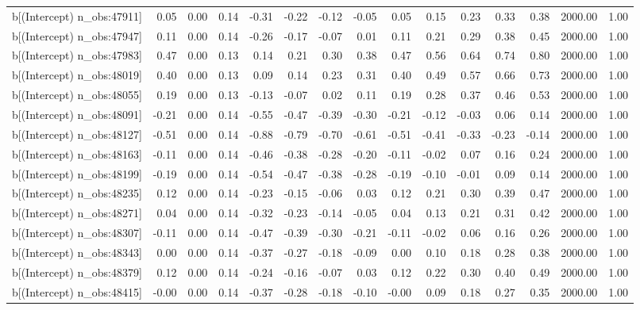 \begin{table}[ht]
\begin{tabular}{rrrrrrrrrrrrrrr}
  b[(Intercept) n\_obs:47911] & 0.05 & 0.00 & 0.14 & -0.31 & -0.22 & -0.12 & -0.05 & 0.05 & 0.15 & 0.23 & 0.33 & 0.38 & 2000.00 & 1.00 \\ 
  b[(Intercept) n\_obs:47947] & 0.11 & 0.00 & 0.14 & -0.26 & -0.17 & -0.07 & 0.01 & 0.11 & 0.21 & 0.29 & 0.38 & 0.45 & 2000.00 & 1.00 \\ 
  b[(Intercept) n\_obs:47983] & 0.47 & 0.00 & 0.13 & 0.14 & 0.21 & 0.30 & 0.38 & 0.47 & 0.56 & 0.64 & 0.74 & 0.80 & 2000.00 & 1.00 \\ 
  b[(Intercept) n\_obs:48019] & 0.40 & 0.00 & 0.13 & 0.09 & 0.14 & 0.23 & 0.31 & 0.40 & 0.49 & 0.57 & 0.66 & 0.73 & 2000.00 & 1.00 \\ 
  b[(Intercept) n\_obs:48055] & 0.19 & 0.00 & 0.13 & -0.13 & -0.07 & 0.02 & 0.11 & 0.19 & 0.28 & 0.37 & 0.46 & 0.53 & 2000.00 & 1.00 \\ 
  b[(Intercept) n\_obs:48091] & -0.21 & 0.00 & 0.14 & -0.55 & -0.47 & -0.39 & -0.30 & -0.21 & -0.12 & -0.03 & 0.06 & 0.14 & 2000.00 & 1.00 \\ 
  b[(Intercept) n\_obs:48127] & -0.51 & 0.00 & 0.14 & -0.88 & -0.79 & -0.70 & -0.61 & -0.51 & -0.41 & -0.33 & -0.23 & -0.14 & 2000.00 & 1.00 \\ 
  b[(Intercept) n\_obs:48163] & -0.11 & 0.00 & 0.14 & -0.46 & -0.38 & -0.28 & -0.20 & -0.11 & -0.02 & 0.07 & 0.16 & 0.24 & 2000.00 & 1.00 \\ 
  b[(Intercept) n\_obs:48199] & -0.19 & 0.00 & 0.14 & -0.54 & -0.47 & -0.38 & -0.28 & -0.19 & -0.10 & -0.01 & 0.09 & 0.14 & 2000.00 & 1.00 \\ 
  b[(Intercept) n\_obs:48235] & 0.12 & 0.00 & 0.14 & -0.23 & -0.15 & -0.06 & 0.03 & 0.12 & 0.21 & 0.30 & 0.39 & 0.47 & 2000.00 & 1.00 \\ 
  b[(Intercept) n\_obs:48271] & 0.04 & 0.00 & 0.14 & -0.32 & -0.23 & -0.14 & -0.05 & 0.04 & 0.13 & 0.21 & 0.31 & 0.42 & 2000.00 & 1.00 \\ 
  b[(Intercept) n\_obs:48307] & -0.11 & 0.00 & 0.14 & -0.47 & -0.39 & -0.30 & -0.21 & -0.11 & -0.02 & 0.06 & 0.16 & 0.26 & 2000.00 & 1.00 \\ 
  b[(Intercept) n\_obs:48343] & 0.00 & 0.00 & 0.14 & -0.37 & -0.27 & -0.18 & -0.09 & 0.00 & 0.10 & 0.18 & 0.28 & 0.38 & 2000.00 & 1.00 \\ 
  b[(Intercept) n\_obs:48379] & 0.12 & 0.00 & 0.14 & -0.24 & -0.16 & -0.07 & 0.03 & 0.12 & 0.22 & 0.30 & 0.40 & 0.49 & 2000.00 & 1.00 \\ 
  b[(Intercept) n\_obs:48415] & -0.00 & 0.00 & 0.14 & -0.37 & -0.28 & -0.18 & -0.10 & -0.00 & 0.09 & 0.18 & 0.27 & 0.35 & 2000.00 & 1.00 \\ 

\end{tabular}
\end{table}
